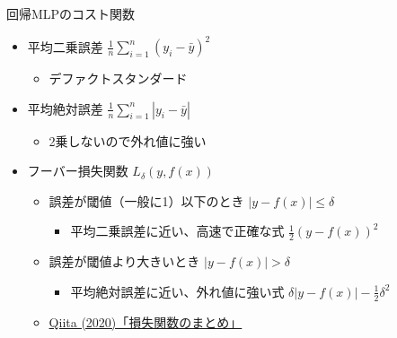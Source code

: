 \documentclass[aspectratio=169, dvipdfmx, 14pt, xcolor={svgnames,dvipsnames}]{beamer}
\def\tightlist{\itemsep1pt\parskip0pt\parsep0pt}
\begin{document}
\begin{frame}{\quad 回帰MLPのコスト関数}
  \begin{itemize}
    \item
          平均二乗誤差 $\displaystyle \frac{1}{n}\sum_{i=1}^n(y_i-\bar{y})^2$

          \begin{itemize}
            \tightlist
            \item
                  デファクトスタンダード
          \end{itemize}
    \item
          平均絶対誤差 $\displaystyle \frac{1}{n}\sum_{i=1}^n|y_i-\bar{y}|$

          \begin{itemize}
            \tightlist
            \item
                  2乗しないので外れ値に強い
          \end{itemize}
    \item
          フーバー損失関数 $L_\delta(y, f(x))$

          \begin{itemize}
            \tightlist
            \item
                  誤差が閾値（一般に1）以下のとき \qquad $|y - f(x)| \leq \delta$

                  \begin{itemize}
                    \tightlist
                    \item
                          平均二乗誤差に近い、\alert{高速で正確な式} \qquad $\frac{1}{2}(y-f(x))^2$
                  \end{itemize}
            \item
                  誤差が閾値より大きいとき \qquad \qquad \qquad $|y - f(x)| > \delta$

                  \begin{itemize}
                    \tightlist
                    \item
                          平均絶対誤差に近い、\alert{外れ値に強い式} \qquad $\delta|y-f(x)|-\frac{1}{2}\delta^2$
                  \end{itemize}
            \item
                  \hyperlink{https://qiita.com/Hatomugi/items/d00c1a7df07e0e3925a8}{Qiita (2020)「損失関数のまとめ」}
          \end{itemize}
  \end{itemize}
\end{frame}
\end{document}
